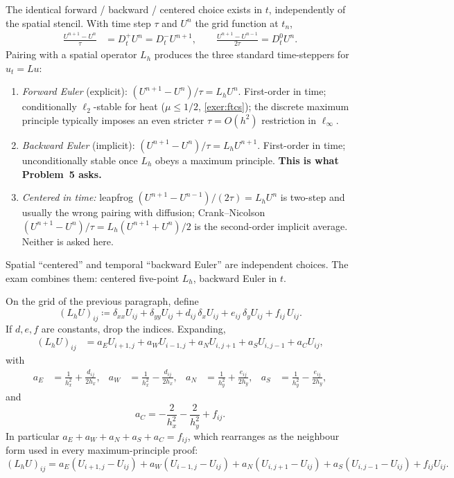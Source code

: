 \documentclass[11pt,a4paper]{article}
\begin{document}
\begin{notation}
\label{not:time-quotients}
The identical forward / backward / centered choice exists in \(t\), independently of the spatial stencil. With time step \(\tau\) and \(U^n\) the grid function at \(t_n\),
\begin{align*}
\frac{U^{n+1}-U^n}{\tau}
&=
D^+_t U^n
=
D^-_t U^{n+1},
\qquad
\frac{U^{n+1}-U^{n-1}}{2\tau}
=
D^0_t U^n.
\end{align*}
Pairing with a spatial operator \(L_h\) produces the three standard time-steppers for \(u_t=Lu\):
\begin{enumerate}[label=\textup{(\roman*)}]
    \item \emph{Forward Euler} (explicit): \((U^{n+1}-U^n)/\tau=L_h U^n\). First-order in time; conditionally \(\ell_2\)-stable for heat (\(\mu\le 1/2\), \cref{exer:ftcs}); the discrete maximum principle typically imposes an even stricter \(\tau=O(h^2)\) restriction in \(\ell_\infty\).
    \item \emph{Backward Euler} (implicit): \((U^{n+1}-U^n)/\tau=L_h U^{n+1}\). First-order in time; unconditionally stable once \(L_h\) obeys a maximum principle. \textbf{This is what Problem~5 asks.}
    \item \emph{Centered in time:} leapfrog \((U^{n+1}-U^{n-1})/(2\tau)=L_h U^n\) is two-step and usually the wrong pairing with diffusion; Crank--Nicolson \((U^{n+1}-U^n)/\tau=L_h(U^{n+1}+U^n)/2\) is the second-order implicit average. Neither is asked here.
\end{enumerate}
Spatial ``centered'' and temporal ``backward Euler'' are independent choices. The exam combines them: centered five-point \(L_h\), backward Euler in \(t\).
\end{notation}

\begin{notation}
\label{not:Lh}
On the grid of the previous paragraph, define
\[
(L_h U)_{ij}
\coloneqq
\delta_{xx}U_{ij}+\delta_{yy}U_{ij}+d_{ij}\,\delta_x U_{ij}+e_{ij}\,\delta_y U_{ij}+f_{ij}\,U_{ij}.
\]
If \(d,e,f\) are constants, drop the indices. Expanding,
\begin{align*}
(L_h U)_{ij}
&=
a_E U_{i+1,j}+a_W U_{i-1,j}+a_N U_{i,j+1}+a_S U_{i,j-1}+a_C U_{ij},
\end{align*}
with
\begin{align*}
a_E
&=
\frac{1}{h_x^2}+\frac{d_{ij}}{2h_x},
&
a_W
&=
\frac{1}{h_x^2}-\frac{d_{ij}}{2h_x},
&
a_N
&=
\frac{1}{h_y^2}+\frac{e_{ij}}{2h_y},
&
a_S
&=
\frac{1}{h_y^2}-\frac{e_{ij}}{2h_y},
\end{align*}
and
\[
a_C
=
-\frac{2}{h_x^2}-\frac{2}{h_y^2}+f_{ij}.
\]
In particular \(a_E+a_W+a_N+a_S+a_C=f_{ij}\), which rearranges as the neighbour form used in every maximum-principle proof:
\begin{equation}
\label{eq:neighbour-form}
(L_h U)_{ij}
=
a_E(U_{i+1,j}-U_{ij})
+a_W(U_{i-1,j}-U_{ij})
+a_N(U_{i,j+1}-U_{ij})
+a_S(U_{i,j-1}-U_{ij})
+f_{ij}U_{ij}.
\end{equation}
\end{notation}
\end{document}
